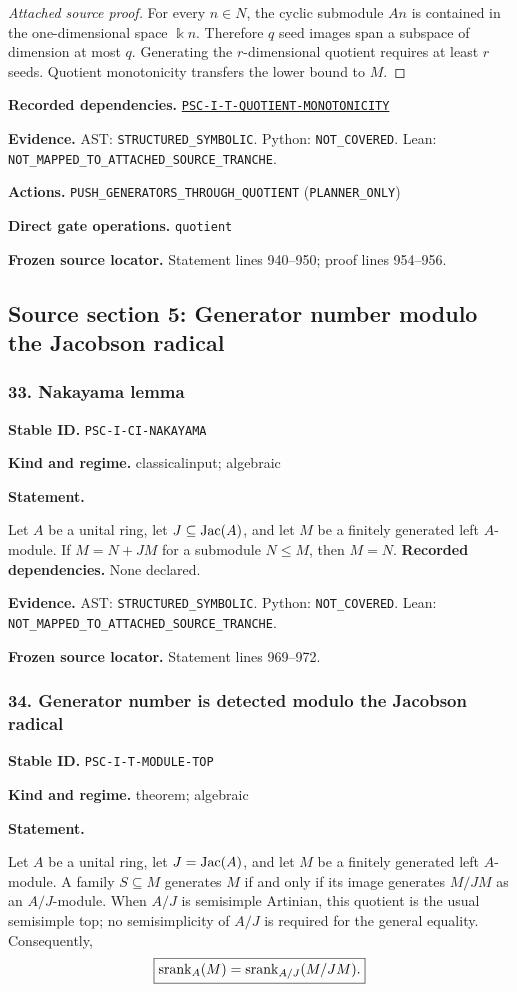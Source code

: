 \documentclass[a4paper,11pt]{article}
\newcommand{\bbk}{\Bbbk}\newcommand{\A}{\mathcal A}\newcommand{\B}{\mathcal B}\newcommand{\Ccal}{\mathcal C}\newcommand{\Pcal}{\mathcal P}\newcommand{\Qcal}{\mathcal Q}\newcommand{\Rcal}{\mathcal R}\newcommand{\Scal}{\mathcal S}
\newcommand{\field}[2]{\noindent\textbf{#1.} #2\par}
\begin{document}
\begin{proof}[Attached source proof]
For every $n\in N$, the cyclic submodule $An$ is contained in the one-dimensional space $\bbk n$.  Therefore $q$ seed images span a subspace of dimension at most $q$.  Generating the $r$-dimensional quotient requires at least $r$ seeds.  Quotient monotonicity transfers the lower bound to $M$.
\end{proof}
\field{Recorded dependencies}{\hyperref[rec:PSC-I-T-QUOTIENT-MONOTONICITY]{\nolinkurl{PSC-I-T-QUOTIENT-MONOTONICITY}}}
\field{Evidence}{AST: \nolinkurl{STRUCTURED_SYMBOLIC}. Python: \nolinkurl{NOT_COVERED}. Lean: \nolinkurl{NOT_MAPPED_TO_ATTACHED_SOURCE_TRANCHE}.}
\field{Actions}{\nolinkurl{PUSH_GENERATORS_THROUGH_QUOTIENT} (\nolinkurl{PLANNER_ONLY})}
\field{Direct gate operations}{\nolinkurl{quotient}}
\field{Frozen source locator}{Statement lines 940--950; proof lines 954--956.}
\clearpage\subsection{Source section 5: Generator number modulo the Jacobson radical}
\subsubsection*{33. Nakayama lemma}
\label{rec:PSC-I-CI-NAKAYAMA}
\field{Stable ID}{\nolinkurl{PSC-I-CI-NAKAYAMA}}
\field{Kind and regime}{classicalinput; algebraic}
\textbf{Statement.}\par
Let $A$ be a unital ring, let $J\subseteq\operatorname{Jac}(A)$, and let $M$ be a finitely generated left $A$-module.  If $M=N+JM$ for a submodule $N\leq M$, then $M=N$.
\field{Recorded dependencies}{None declared.}
\field{Evidence}{AST: \nolinkurl{STRUCTURED_SYMBOLIC}. Python: \nolinkurl{NOT_COVERED}. Lean: \nolinkurl{NOT_MAPPED_TO_ATTACHED_SOURCE_TRANCHE}.}
\field{Frozen source locator}{Statement lines 969--972.}
\subsubsection*{34. Generator number is detected modulo the Jacobson radical}
\label{rec:PSC-I-T-MODULE-TOP}
\field{Stable ID}{\nolinkurl{PSC-I-T-MODULE-TOP}}
\field{Kind and regime}{theorem; algebraic}
\textbf{Statement.}\par
Let $A$ be a unital ring, let $J=\operatorname{Jac}(A)$, and let $M$ be a finitely generated left $A$-module.  A family $S\subseteq M$ generates $M$ if and only if its image generates $M/JM$ as an $A/J$-module.  When $A/J$ is semisimple Artinian, this quotient is the usual semisimple top; no semisimplicity of $A/J$ is required for the general equality.  Consequently,
\[
\boxed{
\operatorname{srank}_A(M)=\operatorname{srank}_{A/J}(M/JM).
}
\]
\end{document}
